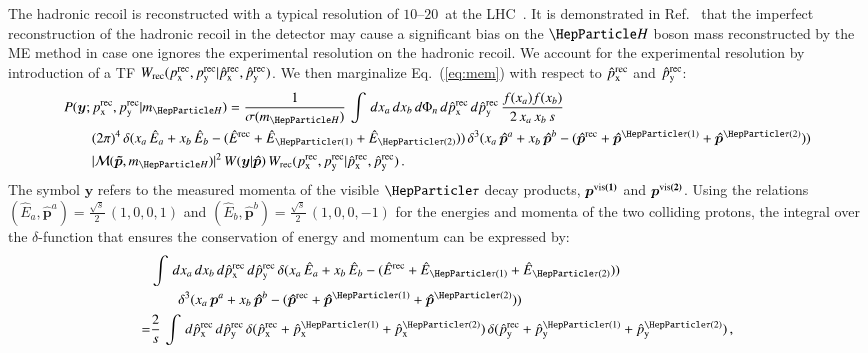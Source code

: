 The hadronic recoil is reconstructed with a typical resolution of $10$--$20$~\GeV at the LHC~\cite{CMS-JME-13-003,ATLAS-CONF-2014-019}.
It is demonstrated in Ref.~\cite{Alwall:2010cq} that the imperfect reconstruction of the hadronic recoil
in the detector may cause a significant bias on the $\PHiggs$ boson mass reconstructed by the ME method in case one ignores
the experimental resolution on the
hadronic recoil. We account
for the experimental resolution by introduction
of a TF $W_{\textrm{rec}}( p_{\textrm{x}}^{\textrm{rec}}, p_{\textrm{y}}^{\textrm{rec}} | \hat{p}_{\textrm{x}}^{\textrm{rec}},
\hat{p}_{\textrm{y}}^{\textrm{rec}} )$.
We then marginalize Eq.~(\ref{eq:mem}) with respect to $\hat{p}_{\textrm{x}}^{\textrm{rec}}$ and $\hat{p}_{\textrm{y}}^{\textrm{rec}}$:
\begin{align}
& P(\bm{y};\pX^{\rec},\pY^{\rec}|m_{\PHiggs}) =
\frac{1}{\sigma(m_{\PHiggs})} \, \int \, dx_{a} \, dx_{b} \, d\Phi_{n} \,
d\pXhat^{\rec} \, d\pYhat^{\rec} \, \frac{f(x_{a}) f(x_{b})}{2 \,
  x_{a} \, x_{b} \, s} \nonumber \\
& \qquad (2\pi)^{4} \, \delta( x_{a} \, \Ehat_{a} + x_{b} \, \Ehat_{b} -
(\Ehat^{\rec} + \Ehat_{\Pgt(1)} + \Ehat_{\Pgt(2)}) ) \, \delta^{3}( x_{a} \,
\bm{\hat{p}}^{a} + x_{b} \, \bm{\hat{p}}^{b} - (\bm{\hat{p}}^{\rec} + \bm{\hat{p}}^{\Pgt(1)}
+ \bm{\hat{p}}^{\Pgt(2)}) ) \nonumber \\
& \qquad \vert \mathcal{M}(\bm{\tilde{p}},m_{\PHiggs}) \vert^{2} \, W(\bm{y}|\bm{\hat{p}}) \, W_{\rec}( \pX^{\rec}, \pY^{\rec} | \pXhat^{\rec}, \pYhat^{\rec} ) \, .
\label{eq:mem_mod_hadRecoil}
\end{align}
The symbol $\bm{y}$ refers to the measured momenta of the visible $\Pgt$ decay products, $\bm{p^{\textrm{vis}(1)}}$ and $\bm{p^{\textrm{vis}(2)}}$.
Using the relations $(\hat{E}_{a},\bm{\hat{p}}^{a}) = \frac{\sqrt{s}}{2} \, (1, 0,
0, 1)$ and $(\hat{E}_{b},\bm{\hat{p}}^{b}) = \frac{\sqrt{s}}{2} \, (1,
0, 0, -1)$
for the energies and momenta of the two colliding protons,
the integral over the $\delta$-function that ensures the conservation of energy and momentum can be expressed by:
\begin{align}
& \int \, dx_{a} \, dx_{b} \, d\pXhat^{\rec} \, d\pYhat^{\rec} \, \delta(
x_{a} \, \Ehat_{a} + x_{b} \, \Ehat_{b} - (\Ehat^{\rec} +
\Ehat_{\Pgt(1)} + \Ehat_{\Pgt(2)})) \nonumber \\
& \qquad \delta^{3}(
x_{a} \, \bm{p}^{a} + x_{b} \, \bm{\hat{p}}^{b} - (\bm{\hat{p}}^{\rec} +
\bm{\hat{p}}^{\Pgt(1)} + \bm{\hat{p}}^{\Pgt(2)})) \nonumber \\
= & \frac{2}{s} \, \int \,
d\pXhat^{\rec} \, d\pYhat^{\rec} \, 
\delta( \pXhat^{\rec} + \pXhat^{\Pgt(1)} + \pXhat^{\Pgt(2)} ) \,
\delta( \pYhat^{\rec} + \pYhat^{\Pgt(1)} + \pYhat^{\Pgt(2)} ) \, ,
\label{eq:delta4}
\end{align}
